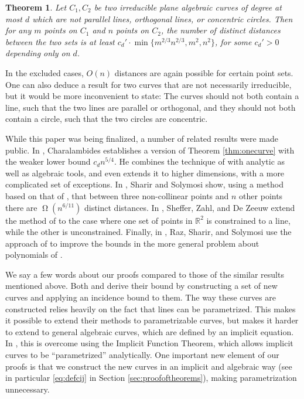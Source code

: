 \documentclass[12pt]{article}
\newtheorem{theorem}{Theorem}[section]
\newcommand{\RR}{\mathbb R}
\begin{document}
\begin{theorem}\label{thm:twocurves}
 Let $C_1,C_2$ be two irreducible plane algebraic curves of degree at most $d$ which are not parallel lines, orthogonal lines, or concentric circles.
 Then for any $m$ points on $C_1$ and $n$ points on $C_2$, the number of distinct distances between the two sets is at least 
 $c_d'\cdot \min\{m^{2/3}n^{2/3}, m^2, n^2\}$,
 for some $c_d'>0$ depending only on $d$. 
\end{theorem}
In the excluded cases, $O(n)$ distances are again possible for certain point sets.
One can also deduce a result for two curves that are not necessarily irreducible,
but it would be more inconvenient to state:
The curves should not both contain a line, such that the two lines are parallel or orthogonal,
and they should not both contain a circle, such that the two circles are concentric.
 
While this paper was being finalized, a number of related results were made public.
In \cite{charalambides:gaps}, Charalambides establishes 
a version of Theorem \ref{thm:onecurve} with the weaker lower bound $c_d n^{5/4}$. 
He combines the technique of \cite{elekes:note} with analytic as well as algebraic tools,
and even extends it to higher dimensions, with a more complicated set of exceptions.
In \cite{sharir:threepoints}, Sharir and Solymosi show,
using a method based on that of \cite{sharir:distances},
that between three non-collinear points and $n$ other points
there are $\upOmega(n^{6/11})$ distinct distances.
In \cite{sheffer:few}, Sheffer, Zahl, and De Zeeuw
extend the method of \cite{sharir:distances} to the case 
where one set of points in $\RR^2$ is constrained to a line, 
while the other is unconstrained.
Finally, in \cite{raz:polynomials}, Raz, Sharir, and Solymosi use the approach of \cite{sharir:distances}
to improve the bounds in the more general problem about polynomials of \cite{elekes:polynomials}.

We say a few words about our proofs compared to those of the similar results mentioned above.
Both \cite{elekes:note} and \cite{sharir:distances} derive their bound 
by constructing a set of new curves and applying an incidence bound to them.
The way these curves are constructed relies heavily on the fact that lines can be parametrized.
This makes it possible to extend their methods to parametrizable curves,
but makes it harder to extend to general algebraic curves,
which are defined by an implicit equation.
In \cite{charalambides:gaps}, this is overcome using the Implicit Function Theorem, 
which allows implicit curves to be ``parametrized'' analytically.
One important new element of our proofs is that we construct the new curves 
in an implicit and algebraic way (see in particular \eqref{eq:defcij} in Section \ref{sec:proofoftheorems}),
making parametrization unnecessary.
\end{document}
